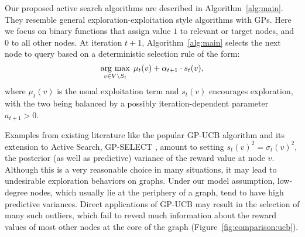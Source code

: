Our proposed active search algorithms are described in Algorithm~\ref{alg:main}. 
They resemble general exploration-exploitation style algorithms with GPs. 
Here we focus on binary functions that assign value $1$ to relevant or target nodes, 
and $0$ to all other nodes. 
At iteration $t+1$, Algorithm~\ref{alg:main} selects the next node to query
based on a deterministic selection rule of the form: 
\begin{equation}
	\operatorname*{\arg\,\max}_{v \in V \setminus S_t} \; \mu_{t}(v) + \alpha_{t+1} \cdot s_{t}(v),
	\label{eq:acquisition}
\end{equation}
where $\mu_{t}(v)$ is the usual exploitation term and $s_{t}(v)$ encourages exploration, 
with the two being balanced by a possibly iteration-dependent parameter $a_{t+1} > 0$.

Examples from existing literature like 
the popular GP-UCB algorithm and its extension to Active Search, GP-SELECT \citep{vanchinathanadaptively}, 
amount to setting $s_{t}(v)^2 = \sigma_t(v)^2$, the posterior (as well as predictive) variance of the reward value at node $v$.
Although this is a very reasonable choice in many situations, it may lead to undesirable exploration behaviors on graphs.
Under our model assumption, low-degree nodes, which usually lie at the periphery of a graph, tend to have high predictive variances.
Direct applications of GP-UCB may result in the selection of many such outliers, which fail to reveal much information
about the reward values of most other nodes at the core of the graph  (Figure~\ref{fig:comparison:ucb}).


